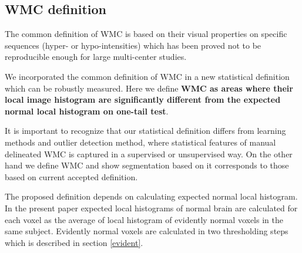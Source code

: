 \subsection{WMC definition}
The common definition of WMC is based on their visual properties on specific sequences (hyper- or hypo-intensities) which has been proved not to be reproducible enough for large multi-center studies. 
\par
We incorporated the common definition of WMC in a new statistical definition which can be robustly measured. Here we  define \textbf{WMC as areas where their local image histogram are significantly different from the expected normal local histogram on one-tail test}.
\par
It is important to recognize that our statistical definition differs from learning methods and outlier detection method, where statistical features of manual delineated WMC is captured in a supervised or unsupervised way.
On the other hand we define WMC and show segmentation based on it corresponds to those based on current accepted definition.
\par
The proposed definition depends on calculating expected normal local histogram. In the present paper expected local histograms of normal brain are calculated for each voxel as the average of local histogram of evidently normal voxels in the same subject. Evidently normal voxels are calculated in two thresholding steps which is described in section \ref{evident}.
  